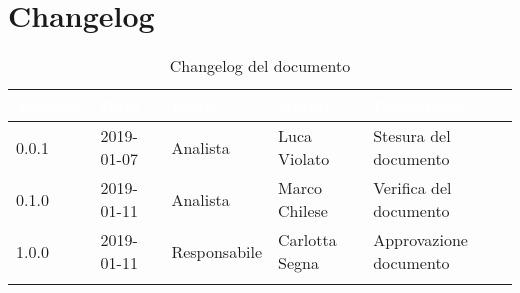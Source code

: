 \newpage

\section{Changelog}

\begin{center}
\begin{longtable}[c]{|m{}|m{}|m{}|m{}|p{}|}
\hline
\rowcolor{bluelogo}\textbf{\textcolor{white}{Versione}} & \textbf{\textcolor{white}{Data}} & \textbf{\textcolor{white}{Ruolo}} & \textbf{\textcolor{white}{Autore}} & \textbf{\textcolor{white}{Descrizione}}\\
\hline \hline
\endfirsthead
0.0.1 & 2019-01-07 & Analista & Luca Violato & Stesura del documento \\
\hline
\rowcolor{grigio}0.1.0 & 2019-01-11 & Analista & Marco Chilese & Verifica del documento \\
\hline
1.0.0 & 2019-01-11 & Responsabile & Carlotta Segna & Approvazione documento \\
\hline
\caption{Changelog del documento}
\end{longtable}
\end{center}
